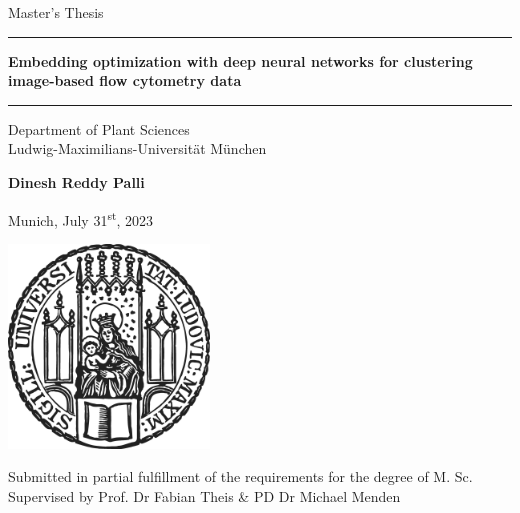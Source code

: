 \documentclass[12pt,a4paper]{article}
\newcommand{\mytitle}{Embedding optimization with deep neural networks for clustering image-based flow cytometry data}
\newcommand{\myname}{Dinesh Reddy Palli}
\newcommand{\mysupervisor}{Prof. Dr Fabian Theis}
\newcommand{\myinternalsupervisor}{PD Dr Michael Menden}
\begin{document}
 
\begin{titlepage}
\begin{center}
    
\LARGE
Master's Thesis
    
\vspace{0.5cm}
      
\rule{\textwidth}{1.5pt}
\LARGE
\textbf{\mytitle}
\rule{\textwidth}{1.5pt}
   
\vspace{0.5cm}
      
\large
Department of Plant Sciences \\
Ludwig-Maximilians-Universität München 

\vfill

\Large
\textbf{\myname}

\vfill

\large
Munich, July 31\textsuperscript{st}, 2023
      
\vfill

\includegraphics[width = 0.4\textwidth]{Figures/sigillum.png}


\vfill

\normalsize
Submitted in partial fulfillment of the requirements for the degree of M. Sc.\\

Supervised by \mysupervisor{} \& \myinternalsupervisor

\end{center}
\end{titlepage}

\newpage



\newpage

\newpage
\tableofcontents

\newpage
\listoffigures
\newpage
\listoftables
\end{document}
